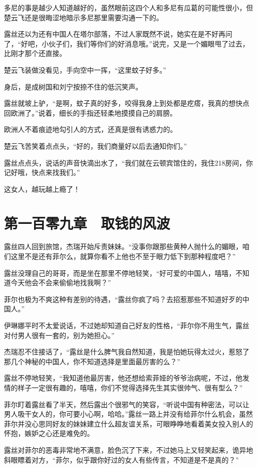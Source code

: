 多尼的事是越少人知道越好的，虽然眼前这四个人和多尼有瓜葛的可能性很小，但楚云飞还是很晦涩地暗示多尼那里需要沟通一下的。

露丝还以为还有中国人在塔尔部落，不过人家既然不说，她实在是不好再问了，“好吧，小伙子们，我们等你们的好消息哦。”说完，又是一个媚眼甩了过去，比刚才那个还直接。

楚云飞装做没看见，手向空中一挥，“这里蚊子好多。”

身后，是成树国和刘宁按捺不住的低沉笑声。

露丝就坡上驴，“是啊，蚊子真的好多，咬得我身上到处都是疙瘩，我真的想快点回欧洲了。”说着，细长的手指还轻柔地摸摸自己的肩膀。

欧洲人不着痕迹地勾引人的方式，还真是很有诱惑力的。

楚云飞苦笑着点点头，“好的，我们商量好以后去通知你们。”

露丝点点头，说话的声音快滴出水了，“我们就在云顿宾馆住的，我住218房间，你记好哦，快点来找我们。”

这女人，越玩越上瘾了！

\section{第一百零九章　取钱的风波}

露丝四人回到旅馆，杰瑞开始斥责妹妹。“没事你跟那些黄种人抛什么的媚眼，咱们这里不是还有菲尔么，就算你看不上他也不至于眼力低下到那种程度吧？”

露丝没理自己的哥哥，而是坐在那里不停地轻笑，“好可爱的中国人，嘻嘻，不知道今天他会不会来偷偷地找我啊？”

菲尔也极为不爽这种有差别的待遇，“露丝你疯了吗？去招惹那些不知道好歹的中国人。”

伊琳娜平时不太爱说话，不过她却知道自己好友的性格，“菲尔你不用生气，露丝对付男人很有一套的，别为她担心。”

杰瑞忍不住接话了，“露丝是什么脾气我自然知道，我是怕她玩得太过火，惹怒了那几个神秘的中国人，你不知道选择是里面最厉害的么？”

露丝不停地轻笑，“我知道他最厉害，他还想给索菲娅的爷爷治病呢，不过，他发情的样子一定很有趣的，嘻嘻，你们不觉得选择先生其实很帅气、很有型么？”

菲尔盯着露丝看了半天，然后露出个很邪气的笑容，“听说中国有种密法，可以让男人吸干女人的，你可要小心啊，哈哈。”露丝一路上并没有给菲尔什么机会，虽然菲尔并没心思同好友的妹妹建立什么超友谊关系，可眼睁睁地看着美女投入别人的怀抱，嫉妒之心还是难免的。

露丝对菲尔的恶毒非常地不满意，脸色沉了下来，不过她马上又轻笑起来，诡异地斜眼瞟着对方，“菲尔，似乎跟你好过的女人有些传言，不知道是不是真的？”

